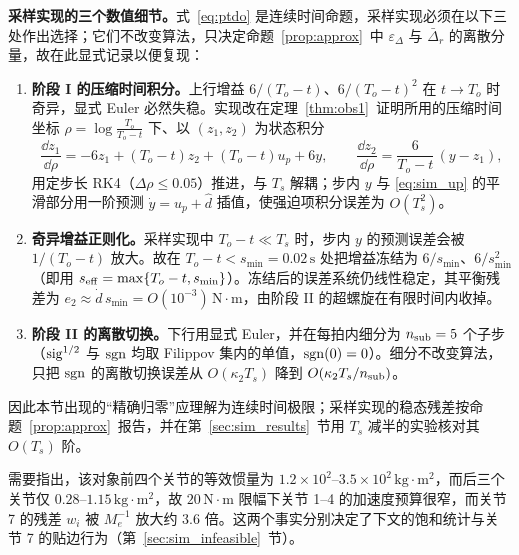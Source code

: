 \textbf{采样实现的三个数值细节。}式~\eqref{eq:ptdo} 是连续时间命题，采样实现必须在以下三处作出选择；它们不改变算法，只决定命题~\ref{prop:approx}~中 \(\varepsilon_\Delta\) 与 \(\bar\Delta_r\) 的离散分量，故在此显式记录以便复现：

\begin{enumerate}
  \item[\textup{(a)}] \textbf{阶段 I 的压缩时间积分。}上行增益 \(6/(T_o-t)\)、\(6/(T_o-t)^2\) 在 \(t\to T_o\) 时奇异，显式 Euler 必然失稳。实现改在定理~\ref{thm:obs1}~证明所用的压缩时间坐标 \(\rho=\log\frac{T_o}{T_o-t}\) 下、以 \((z_1,z_2)\) 为状态积分
\[
\frac{\dd z_1}{\dd\rho}=-6z_1+(T_o-t)z_2+(T_o-t)u_p+6y,\qquad
\frac{\dd z_2}{\dd\rho}=\frac{6}{T_o-t}\,(y-z_1),
\]
用定步长 RK4（\(\Delta\rho\le0.05\)）推进，与 \(T_s\) 解耦；步内 \(y\) 与 \eqref{eq:sim_up} 的平滑部分用一阶预测 \(\dot y=u_p+\hat d\) 插值，使强迫项积分误差为 \(O(T_s^2)\)。
  \item[\textup{(b)}] \textbf{奇异增益正则化。}采样实现中 \(T_o-t\ll T_s\) 时，步内 \(y\) 的预测误差会被 \(1/(T_o-t)\) 放大。故在 \(T_o-t<s_{\min}=0.02\,\mathrm s\) 处把增益冻结为 \(6/s_{\min}\)、\(6/s_{\min}^2\)（即用 \(s_{\rm eff}=\max\{T_o-t,s_{\min}\}\)）。冻结后的误差系统仍线性稳定，其平衡残差为 \(e_2\approx\dot d\,s_{\min}=O(10^{-3})\,\mathrm{N\cdot m}\)，由阶段 II 的超螺旋在有限时间内收掉。
  \item[\textup{(c)}] \textbf{阶段 II 的离散切换。}下行用显式 Euler，并在每拍内细分为 \(n_{\rm sub}=5\) 个子步（\(\operatorname{sig}^{1/2}\) 与 \(\operatorname{sgn}\) 均取 Filippov 集内的单值，\(\operatorname{sgn}(0)=0\)）。细分不改变算法，只把 \(\operatorname{sgn}\) 的离散切换误差从 \(O(\kappa_2T_s)\) 降到 \(O(\kappa_2T_s/n_{\rm sub})\)。
\end{enumerate}

因此本节出现的“精确归零”应理解为连续时间极限；采样实现的稳态残差按命题~\ref{prop:approx}~报告，并在第~\ref{sec:sim_results}~节用 \(T_s\) 减半的实验核对其 \(O(T_s)\) 阶。

需要指出，该对象前四个关节的等效惯量为 \(1.2\times10^{2}\)--\(3.5\times10^{2}\,\mathrm{kg\cdot m^2}\)，而后三个关节仅 \(0.28\)--\(1.15\,\mathrm{kg\cdot m^2}\)，故 \(20\,\mathrm{N\cdot m}\) 限幅下关节 1--4 的加速度预算很窄，而关节 7 的残差 \(w_i\) 被 \(M_e^{-1}\) 放大约 \(3.6\) 倍。这两个事实分别决定了下文的饱和统计与关节 7 的贴边行为（第~\ref{sec:sim_infeasible}~节）。

